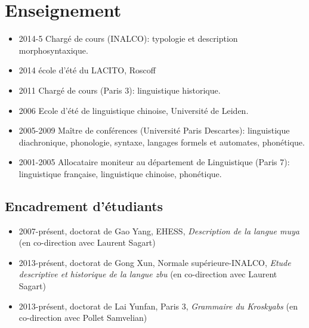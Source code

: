 \documentclass[oldfontcommands,oneside,a4paper,11pt]{article}
\begin{document}
\section*{Enseignement}
\begin{itemize}
\item 2014-5 Chargé de cours (INALCO): typologie et description morphosyntaxique.
\item 2014 école d'été du LACITO, Roscoff
\item 2011 Chargé de cours (Paris 3): linguistique historique.
\item  2006 Ecole d'été de linguistique chinoise, Université de Leiden.
\item 2005-2009 Maître de conférences (Université Paris Descartes): linguistique diachronique, phonologie, syntaxe, langages formels et automates, phonétique.
\item 2001-2005 Allocataire moniteur au département de Linguistique (Paris 7): linguistique française, linguistique chinoise, phonétique.
\end{itemize}


\subsection*{Encadrement d'étudiants}
\begin{itemize}
\item 2007-présent, doctorat de Gao Yang, EHESS, \textit{Description de la langue muya} (en co-direction avec Laurent Sagart)
\item 2013-présent, doctorat de Gong Xun, Normale supérieure-INALCO, \textit{Etude descriptive et historique de la langue zbu} (en co-direction avec Laurent Sagart)
\item 2013-présent, doctorat de Lai Yunfan, Paris 3, \textit{Grammaire du Kroskyabs} (en co-direction avec Pollet Samvelian)
\end{itemize}
\end{document}
